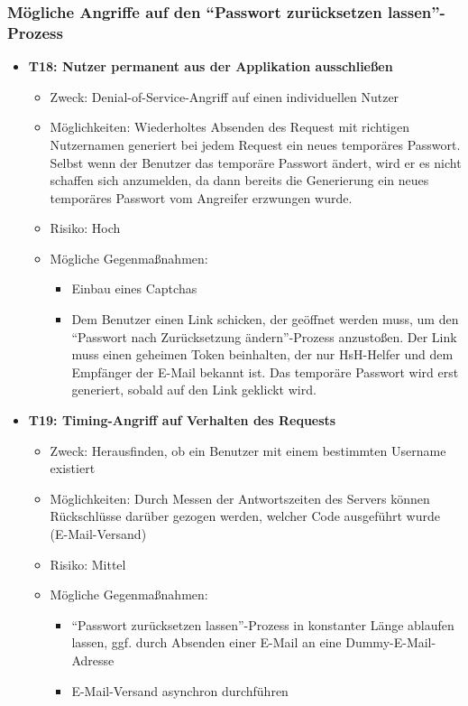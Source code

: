 \documentclass[12pt,DIV14,BCOR10mm,a4paper,parskip=half-,headsepline,headinclude,english,ngerman,bibliography=totocnumbered]{scrreprt}
\begin{document}
\subsubsection{Mögliche Angriffe auf den \enquote{Passwort zurücksetzen lassen}-Prozess}

\begin{itemize}
  \hypertarget{threat18}{}
  \item \textbf{T18: Nutzer permanent aus der Applikation ausschließen}
  \begin{itemize}
  \item Zweck: Denial-of-Service-Angriff auf einen individuellen Nutzer
  \item Möglichkeiten: Wiederholtes Absenden des Request mit richtigen Nutzernamen generiert bei jedem Request ein neues temporäres Passwort. Selbst wenn der Benutzer das temporäre Passwort ändert, wird er es nicht schaffen sich anzumelden, da dann bereits die Generierung ein neues temporäres Passwort vom Angreifer erzwungen wurde.
  \item Risiko: Hoch
  \item Mögliche Gegenmaßnahmen:
  \begin{itemize}
  \item Einbau eines Captchas
  \item Dem Benutzer einen Link schicken, der geöffnet werden muss, um den \enquote{Passwort nach Zurücksetzung ändern}-Prozess anzustoßen. Der Link muss einen geheimen Token beinhalten, der nur HsH-Helfer und dem Empfänger der E-Mail bekannt ist. Das temporäre Passwort wird erst generiert, sobald auf den Link geklickt wird.
  \end{itemize}
\end{itemize}

  \hypertarget{threat19}{}
  \item \textbf{T19: Timing-Angriff auf Verhalten des Requests}
  \begin{itemize}
  \item Zweck: Herausfinden, ob ein Benutzer mit einem bestimmten Username existiert
  \item Möglichkeiten: Durch Messen der Antwortszeiten des Servers können Rück\-schlüsse darüber gezogen werden, welcher Code ausgeführt wurde (E-Mail-Versand)
  \item Risiko: Mittel
  \item Mögliche Gegenmaßnahmen:
  \begin{itemize}
    \item \enquote{Passwort zurücksetzen lassen}-Prozess in konstanter Länge ablaufen lassen, ggf. durch Absenden einer E-Mail an eine Dummy-E-Mail-Adresse
    \item E-Mail-Versand asynchron durchführen
    \end{itemize}
  \end{itemize}


\end{itemize}
\end{document}
